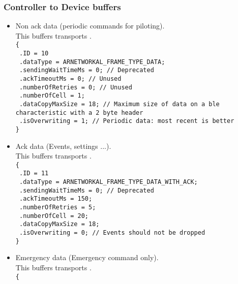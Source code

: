\subsubsection*{Controller to Device buffers}
\begin{itemize}
\item{
    Non ack data (periodic commands for piloting).\\
    This buffers transports .\\
    \texttt{\{}\\
    \texttt{  .ID = 10}\\
    \texttt{  .dataType = ARNETWORKAL\_FRAME\_TYPE\_DATA;}\\
    \texttt{  .sendingWaitTimeMs = 0; // Deprecated}\\
    \texttt{  .ackTimeoutMs = 0; // Unused}\\
    \texttt{  .numberOfRetries = 0; // Unused}\\
    \texttt{  .numberOfCell = 1;}\\
    \texttt{  .dataCopyMaxSize = 18; // Maximum size of data on a ble characteristic with a 2 byte header}\\
    \texttt{  .isOverwriting = 1; // Periodic data: most recent is better}\\
    \texttt{\}}
  }
\item{
    Ack data (Events, settings ...).\\
    This buffers transports .\\
    \texttt{\{}\\
    \texttt{  .ID = 11}\\
    \texttt{  .dataType = ARNETWORKAL\_FRAME\_TYPE\_DATA\_WITH\_ACK;}\\
    \texttt{  .sendingWaitTimeMs = 0; // Deprecated}\\
    \texttt{  .ackTimeoutMs = 150;}\\
    \texttt{  .numberOfRetries = 5;}\\
    \texttt{  .numberOfCell = 20;}\\
    \texttt{  .dataCopyMaxSize = 18;}\\
    \texttt{  .isOverwriting = 0; // Events should not be dropped}\\
    \texttt{\}}
}
\item{
    Emergency data (Emergency command only).\\
    This buffers transports .\\
    \texttt{\{}\\
}
\end{itemize}
